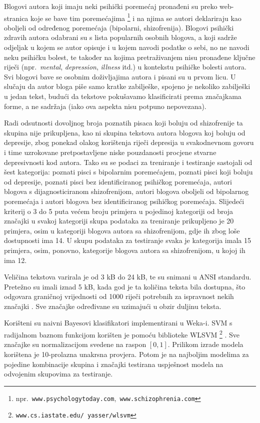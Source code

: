 \documentclass[10pt, a4paper]{article}
\begin{document}
Blogovi autora koji imaju neki psihički poremećaj pronađeni su preko web-stranica koje se bave tim poremećajima \footnote{npr.~\texttt{www.psychologytoday.com},\texttt{ www.schizophrenia.com}} i na njima se autori deklariraju kao oboljeli od određenog poremećaja (bipolarni, shizofrenija). Blogovi psihički zdravih autora odabrani su s lista popularnih osobnih blogova, a koji sadrže odjeljak u kojem se autor opisuje i u kojem navodi podatke o sebi, no ne navodi neku psihičku bolest, te također na kojima pretraživanjem nisu pronađene ključne riječi (npr.~\emph{mental}, \emph{depression}, \emph{illness} itd.) u kontekstu psihičke bolesti autora. Svi blogovi bave se osobnim doživljajima autora i pisani su u prvom licu. U slučaju da autor bloga piše samo kratke zabilješke, spojeno je nekoliko zabilješki u jedan tekst, budući da tekstove pokušavamo klasificirati prema značajkama forme, a ne sadržaja (iako ova aspekta nisu potpuno nepovezana).

Radi odsutnosti dovoljnog broja poznatih pisaca koji boluju od shizofrenije ta skupina nije prikupljena, kao ni skupina tekstova autora blogova koj boluju od depresije, zbog ponekad olakog korištenja riječi depresija u svakodnevnom govoru i time uzrokovane pretpostavljene niske pouzdanosti procjene stvarne depresivnosti kod autora. Tako su se podaci za treniranje i testiranje sastojali od šest kategorija: poznati pisci s bipolarnim poremećajem, poznati pisci koji boluju od depresije, poznati pisci bez identificiranog psihičkog poremećaja, autori blogova s dijagnosticiranom shizofrenijom, autori blogova oboljeli od bipolarnog poremećaja i autori blogova bez identificiranog psihičkog poremećaja. Slijedeći kriterij o 3 do 5 puta većem broju primjera u pojedinoj kategoriji od broja značajki \citep{ribaric} u svakoj kategoriji skupa podataka za treniranje prikupljeno je 20 primjera, osim u kategoriji blogova autora sa shizofrenijom, gdje ih zbog loše dostupnosti ima 14. U skupu podataka za testiranje svaka je kategorija imala 15 primjera, osim, ponovno, kategorije blogova autora sa shizofrenijom, u kojoj ih ima 12. 

Veličina tekstova varirala je od 3 kB do 24 kB, te su snimani u ANSI standardu. Pretežno su imali iznad 5 kB, kada god je ta količina teksta bila dostupna, što odgovara graničnoj vrijednosti od 1000 riječi potrebnih za ispravnost nekih značajki  \citep{tweedie}. Sve značajke određivane su uzimajući u obzir duljinu teksta. 
 
Korišteni su naivni Bayesovi klasifikatori implementirani u Weka-i. SVM s radijalnom baznom funkcijom korišten je pomoću biblioteke WLSVM \footnote{\texttt{www.cs.iastate.edu/~yasser/wlsvm}} \citep{yh05}. Sve značajke su normalizacijom svedene na raspon $ [0,1]$. Prilikom izrade modela korištena je 10-prolazna unakrsna provjera. Potom je na najboljim modelima za pojedine kombinacije skupina i značajki testirana uspješnost modela na odvojenim skupovima za testiranje.
\end{document}
